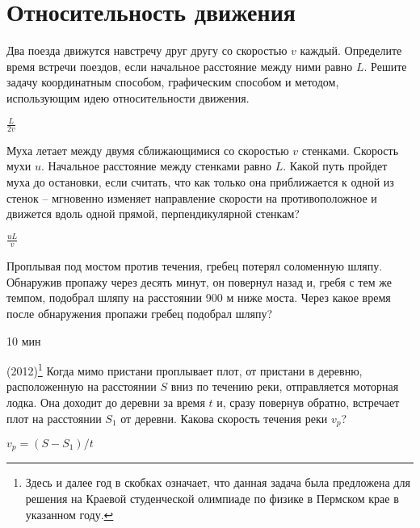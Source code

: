 \section{Относительность движения}

\begin{ex}
Два поезда движутся навстречу друг другу со скоростью $v$ каждый. 
Определите время встречи поездов, если начальное расстояние между ними равно $L$. 
Решите задачу координатным способом, графическим способом и методом, использующим идею относительности движения.
\begin{ans}
$\frac{L}{2v}$
\end{ans}
\end{ex}

\begin{ex}
Муха летает между двумя сближающимися со скоростью $v$ стенками. 
Скорость мухи $u$. Начальное расстояние между стенками равно $L$. 
Какой путь пройдет муха до остановки, если считать, что как только она приближается к одной из стенок -- мгновенно изменяет 
направление скорости на противоположное и движется вдоль одной прямой, перпендикулярной стенкам?
\begin{ans}
$\frac{uL}{v}$
\end{ans}
\end{ex}

\begin{ex}
Проплывая под мостом против течения, гребец потерял соломенную шляпу. Обнаружив пропажу через десять минут, он повернул назад и, гребя с тем же темпом, подобрал шляпу на расстоянии 900 м ниже моста. 
Через какое время после обнаружения пропажи гребец подобрал шляпу?
\begin{ans}
10 мин
\end{ans}
\end{ex}

\begin{ex}
(2012)\footnote{Здесь и далее год в скобках означает, что данная задача была предложена для решения на Краевой студенческой олимпиаде по физике в Пермском крае в указанном году.}
Когда мимо пристани проплывает плот, от пристани в деревню, расположенную на расстоянии $S$ вниз по течению реки, отправляется моторная лодка. Она доходит до деревни за время $t$ и, сразу повернув обратно, встречает плот на расстоянии $ S_1 $ от деревни. Какова скорость течения реки $v_p$?
\begin{ans}
$v_p = (S - S_1)/t$
\end{ans}
\end{ex}

